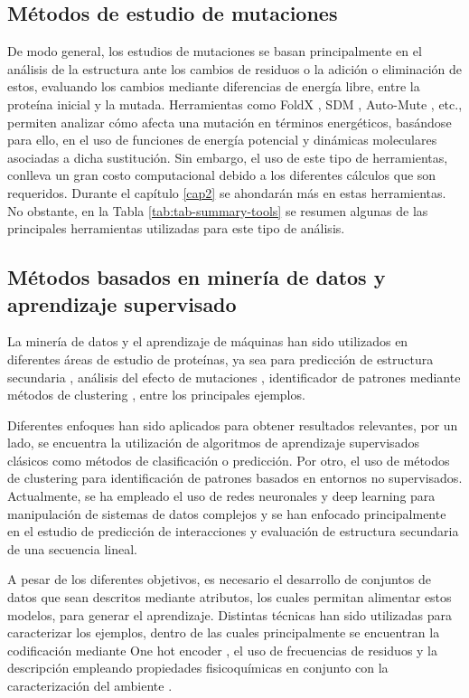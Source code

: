 \subsection{Métodos de estudio de mutaciones}

De modo general, los estudios de mutaciones se basan principalmente en el análisis de la estructura ante los cambios de residuos o la adición o eliminación de estos, evaluando los cambios mediante diferencias de energía libre, entre la proteína inicial y la mutada. Herramientas como FoldX \cite{Schymkowitz2005}, SDM \cite{Pandurangan2017}, Auto-Mute \cite{Masso2010}, etc., permiten analizar cómo afecta una mutación en términos energéticos, basándose para ello, en el uso de funciones de energía potencial y dinámicas moleculares asociadas a dicha sustitución. Sin embargo, el uso de este tipo de herramientas, conlleva un gran costo computacional debido a los diferentes cálculos que son requeridos. Durante el capítulo \ref{cap2} se ahondarán más en estas herramientas. No obstante, en la Tabla \ref{tab:tab-summary-tools} se resumen algunas de las principales herramientas utilizadas para este tipo de análisis.

\subsection{Métodos basados en minería de datos y aprendizaje supervisado}

La minería de datos y el aprendizaje de máquinas han sido utilizados en diferentes áreas de estudio de proteínas, ya sea para predicción de estructura secundaria \cite{hua2001novel, Muggleton1992, WANG2008262}, análisis del efecto de mutaciones \cite{capriotti2005mutant2, capriotti2008three, vaisman}, identificador de patrones mediante métodos de clustering \cite{schueler2003conserved, orengo1997cath}, entre los principales ejemplos.

Diferentes enfoques han sido aplicados para obtener resultados relevantes, por un lado, se encuentra la utilización de algoritmos de aprendizaje supervisados clásicos como métodos de clasificación o predicción. Por otro, el uso de métodos de clustering para identificación de patrones basados en entornos no supervisados. Actualmente, se ha empleado el uso de redes neuronales y deep learning para manipulación de sistemas de datos complejos y se han enfocado principalmente en el estudio de predicción de interacciones y evaluación de estructura secundaria de una secuencia lineal.

A pesar de los diferentes objetivos, es necesario el desarrollo de conjuntos de datos que sean descritos mediante atributos, los cuales permitan alimentar estos modelos, para generar el aprendizaje. Distintas técnicas han sido utilizadas para caracterizar los ejemplos, dentro de las cuales principalmente se encuentran la codificación mediante One hot encoder \cite{pedregosa2011scikit}, el uso de frecuencias de residuos \cite{ozbudak2014protein} y la descripción empleando propiedades fisicoquímicas en conjunto con la caracterización del ambiente \cite{capriotti2005mutant2, capriotti2008three}.

